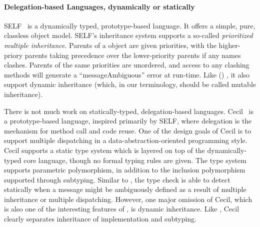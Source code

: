 

\paragraph{Delegation-based Languages, dynamically or statically}

SELF~\cite{chambers1991parents} is a dynamically typed, prototype-based
language. It offers a simple, pure, classless object model. SELF's inheritance
system supports a so-called \textit{prioritized multiple inheritance}. Parents
of a object are given priorities, with the higher-priory parents taking
precedence over the lower-priority parents if any names clashes. Parents of the
same priorities are unordered, and access to any clashing methods will generate
a ``messageAmbiguous'' error at run-time. Like () \name, it
also support dynamic inheritance (which, in our terminology, should be called
mutable inheritance).

There is not much work on statically-typed, delegation-based languages.
Cecil~\cite{chambers1992object, chambers1993cecil} is a prototype-based
language, inspired primarily by SELF, where delegation is the mechanism for
method call and code reuse. One of the design goals of Cecil is to support
multiple dispatching in a data-abstraction-oriented programming style. Cecil
supports a static type system which is layered on top of the dynamically-typed
core language, though no formal typing rules are given. The type system supports
parametric polymorphism, in addition to the inclusion polymorphism supported
through subtyping. Similar to \name, the type check is able to detect statically
when a message might be ambiguously defined as a result of multiple inheritance
or multiple dispatching. However, one major omission of Cecil, which is also one
of the interesting features of \name, is dynamic inheritance. Like \name, Cecil
clearly separates inheritance of implementation and subtyping.

